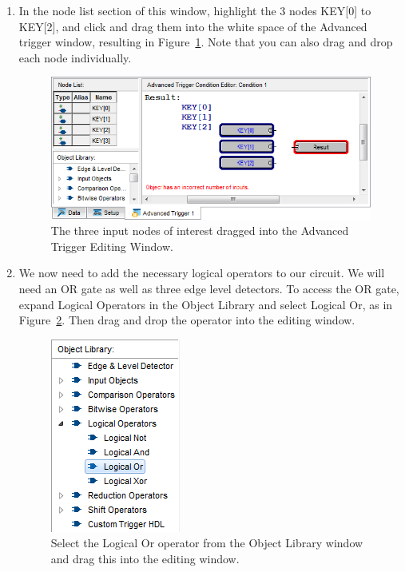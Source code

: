 \documentclass[11pt, twoside, pdftex]{article}
\begin{document}
\begin{enumerate}
\item In the node list section of this window, highlight the 3 nodes KEY[0] to KEY[2], and click and drag them into the white space
of the Advanced trigger window, resulting in Figure~\ref{fig:19}. Note that you can also drag and drop each node individually.
  
\begin{figure}[H]
   \begin{center}
      \includegraphics[scale=0.65]{figures/figure19.png}
   \caption{The three input nodes of interest dragged into the Advanced Trigger Editing Window.} 
	 \label{fig:19}
	 \end{center}
\end{figure}

\item We now need to add the necessary logical operators to our circuit. We will need an OR gate as well as three edge level detectors. To access
the OR gate, expand {\sf Logical Operators} in the Object Library and select {\sf Logical Or}, as in Figure~\ref{fig:20}. Then drag and drop
the operator into the editing window.
  
\begin{figure}[H]
   \begin{center}
      \includegraphics[scale=0.65]{figures/figure20.png}
   \caption{Select the Logical Or operator from the Object Library window and drag this into the editing window.} 
	 \label{fig:20}
	 \end{center}
\end{figure}


\end{enumerate}
\end{document}
